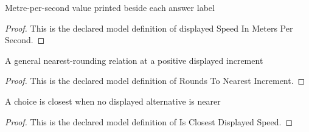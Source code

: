 \begin{definition}
  \label{def:physics:phyx-mini-0837:phyxminiproblems-problemphyxmini0837-displayedspeedinmeterspersecond}
  Metre-per-second value printed beside each answer label
\end{definition}
\begin{proof}
  This is the declared model definition of displayed Speed In Meters Per Second.
\end{proof}
\begin{definition}
  \label{def:physics:phyx-mini-0837:phyxminiproblems-problemphyxmini0837-roundstonearestincrement}
  A general nearest-rounding relation at a positive displayed increment
\end{definition}
\begin{proof}
  This is the declared model definition of Rounds To Nearest Increment.
\end{proof}
\begin{definition}
  \label{def:physics:phyx-mini-0837:phyxminiproblems-problemphyxmini0837-isclosestdisplayedspeed}
  A choice is closest when no displayed alternative is nearer
\end{definition}
\begin{proof}
  This is the declared model definition of Is Closest Displayed Speed.
\end{proof}
